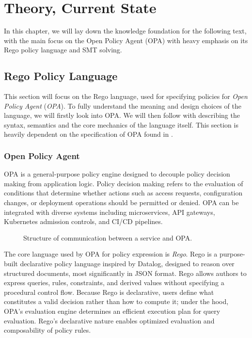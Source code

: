 \chapter{Theory, Current State}
\label{ch:theory}

In this chapter, we will lay down the knowledge foundation for the following text, with the main focus on the Open Policy Agent (OPA) with heavy emphasis on its Rego policy language and SMT solving.

\section{Rego Policy Language}
\label{sec:rego}

This section will focus on the Rego language, used for specifying policies for \emph{Open Policy Agent} (\emph{OPA}).
To fully understand the meaning and design choices of the language, we will firstly look into OPA.
We will then follow with describing the syntax, semantics and the core mechanics of the language itself.
This section is heavily dependent on the specification of OPA found in \cite{opa:web}.

\subsection{Open Policy Agent}

OPA is a general-purpose policy engine designed to decouple policy decision making from application logic.
Policy decision making refers to the evaluation of conditions that determine whether actions such as access requests, configuration changes, or deployment operations should be permitted or denied.
OPA can be integrated with diverse systems including microservices, API gateways, Kubernetes admission controls, and CI/CD pipelines.

\begin{figure}
    \label{fig:opa-query-graph}
    \centering
    
    \caption{Structure of communication between a service and OPA.}
\end{figure}

The core language used by OPA for policy expression is \emph{Rego}.
Rego is a purpose-built declarative policy language inspired by Datalog, designed to reason over structured documents, most significantly in JSON format.
Rego allows authors to express queries, rules, constraints, and derived values without specifying a procedural control flow.
Because Rego is declarative, users define what constitutes a valid decision rather than how to compute it; under the hood, OPA’s evaluation engine determines an efficient execution plan for query evaluation.
Rego’s declarative nature enables optimized evaluation and composability of policy rules.

